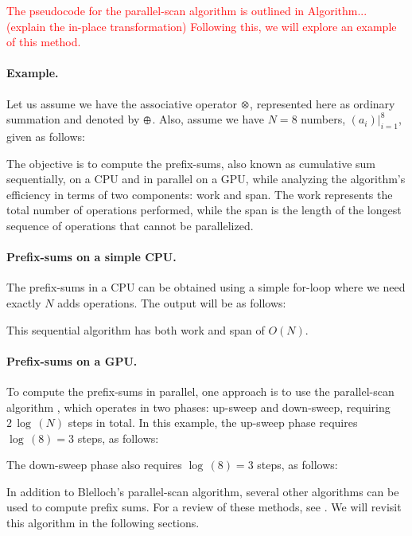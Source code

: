\documentclass[dissertation,math,vertlayout,pdfa,colorlinks,nologo]{aaltoseries}
\DeclareMathOperator*{\Motimes}{\text{\raisebox{0.25ex}{\scalebox{0.65}{$\bigotimes$}}}}
\DeclareMathOperator*{\Moplus}{\text{\raisebox{0.25ex}{\scalebox{0.65}{$\bigoplus$}}}}
\begin{document}
    \textcolor{red}{The pseudocode for the parallel-scan algorithm is outlined in Algorithm... (explain the in-place transformation) Following this, we will explore an example of this method.}

    \paragraph{\textbf{Example.}} Let us assume we have the associative operator $\Motimes$, represented here as ordinary summation and denoted by $\Moplus$. Also, assume we have $N = 8$ numbers, $(a_i)|_{i = 1}^8$, given as follows:
    \begin{figure}[H]
        \centering
        \resizebox{\columnwidth}{!}{}
    \end{figure}
    The objective is to compute the prefix-sums, also known as cumulative sum sequentially, on a CPU and in parallel on a GPU, while analyzing the algorithm's efficiency in terms of two components: work and span. The work represents the total number of operations performed, while the span is the length of the longest sequence of operations that cannot be parallelized.
    \paragraph{\textbf{Prefix-sums on a simple CPU.}} 
    The prefix-sums in a CPU can be obtained using a simple for-loop where we need exactly $N$ adds operations. The output will be as follows: 
    \begin{figure}[H]
        \centering
        \resizebox{\columnwidth}{!}{}
    \end{figure}
    This sequential algorithm has both work and span of $O(N)$.
    \paragraph{\textbf{Prefix-sums on a GPU.}} To compute the prefix-sums in parallel, one approach is to use the parallel-scan algorithm \citep{blelloch1989scans}, which operates in two phases: up-sweep and down-sweep, requiring $2\, \log\,(N)$ steps in total. In this example, the up-sweep phase requires $\log\,(8) = 3$ steps, as follows:
    \begin{figure}[H]
        \centering
        \resizebox{\columnwidth}{!}{}
    \end{figure}
    The down-sweep phase also requires $\log\,(8) = 3$ steps, as follows:
    \begin{figure}[H]
        \centering
        \resizebox{\columnwidth}{!}{}
    \end{figure}
    In addition to Blelloch's parallel-scan algorithm, several other algorithms can be used to compute prefix sums. For a review of these methods, see \citep{pibiri2021practical}. We will revisit this algorithm in the following sections.
    
\end{document}
